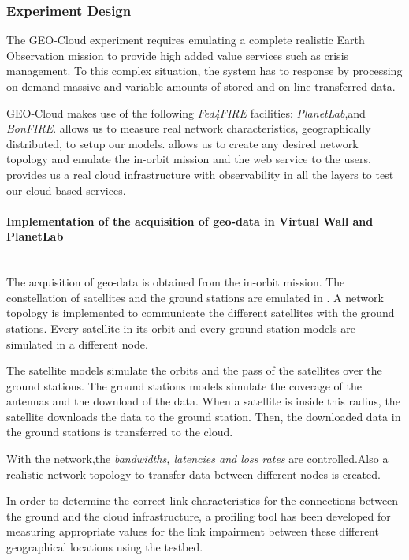 \subsubsection{Experiment Design}


The GEO-Cloud experiment requires emulating a complete realistic Earth Observation mission to provide high added value services such as crisis management. To this complex situation, the system has to response by processing on demand massive and variable amounts of stored and on line transferred data.

GEO-Cloud makes use of the following \emph{Fed4FIRE} facilities: \emph{PlanetLab},\vw and
\emph{BonFIRE}. \pl allows us to measure real network characteristics, geographically
distributed, to setup our models. \vw allows us to create any desired network
topology and emulate the in-orbit mission and the web service to the
users. \bonfire provides us a real cloud infrastructure with observability in
all the layers to test our cloud based services.


\paragraph{Implementation of the acquisition of geo-data in Virtual Wall and
  PlanetLab}~\\
The acquisition of geo-data is obtained from the in-orbit mission. The
constellation of satellites and the ground stations are emulated in \vw. A
network topology is implemented to communicate the different satellites with the
ground stations. Every satellite in its orbit and every ground station models
are simulated in a different node.

The satellite models simulate the orbits and the pass of the satellites over the
ground stations. The ground stations models simulate the coverage of the
antennas and the download of the data. When a satellite is inside this radius,
the satellite downloads the data to the ground station. Then, the downloaded data in the ground stations is transferred to the \bonfire cloud.

With the \vw network,the \emph{bandwidths, latencies and loss rates} are
controlled.Also a realistic network topology to transfer data between different
nodes is created.

In order to determine the correct link characteristics for the connections
between the ground and the cloud infrastructure, a profiling tool has been
developed for measuring appropriate values for the link impairment between these different geographical locations using the \pl testbed.


